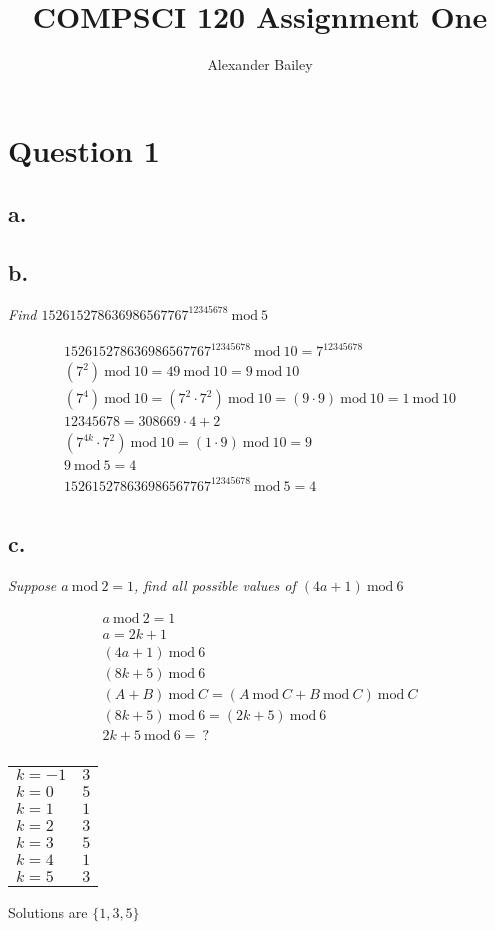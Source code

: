 \documentclass[a4paper, 12pt]{article}
\title{COMPSCI 120 Assignment One}
\author{Alexander Bailey}
\newcommand{\Mod}[1]{\ \mathrm{mod}\ #1}
\begin{document}
\maketitle
\section*{Question 1}
\subsection*{a.}
\subsection*{b.}
\begin{center}
    \textit{Find $152615278636986567767^{12345678} \Mod 5$}
\end{center}
\begin{align*}
    152615278636986567767^{12345678} \Mod 10 = 7^{12345678} \\
    (7^2) \Mod 10 = 49 \Mod 10 = 9 \Mod 10 \\
    (7^4) \Mod 10 = (7^2 \cdot 7^2) \Mod 10 = (9 \cdot 9) \Mod 10 = 1 \Mod 10 \\
    12345678 = 308669 \cdot 4 + 2 \\
    (7^{4k} \cdot 7^2) \Mod 10 = (1\cdot9)\Mod10 = 9 \\
    9 \Mod 5 = 4 \\
    152615278636986567767^{12345678} \Mod 5 = 4 \\
\end{align*} 

\subsection*{c.}
\begin{center}
    \textit{Suppose $a\Mod2 = 1$, find all possible values of $(4a+1)\Mod6$}
\end{center}
\begin{align*}
    a \Mod 2 = 1 \\
    a = 2k + 1 \\
    (4a + 1) \Mod 6 \\
    (8k+5) \Mod 6 \\
    (A + B) \Mod C = (A \Mod C + B \Mod C) \Mod C \\
    (8k +  5)\Mod 6 = (2k+5)\Mod6 \\
    2k+5\Mod6 = \>? \\
\end{align*}
\begin{tabular}{l|l} 
    $k=-1$ & $3$ \\
    $k=0$ & $5$ \\
    $k=1$ & $1$ \\
    $k=2$ & $3$ \\
    $k=3$ & $5$ \\
    $k=4$ & $1$ \\
    $k=5$ & $3$ \\
\end{tabular}
Solutions are $\{1,3,5\}$
\end{document}
